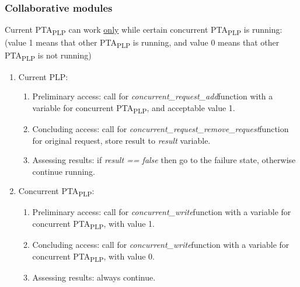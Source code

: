 \subsubsection{Collaborative modules \label{memory_module_applications_collaborative_modules}}
Current PTA\textsubscript{PLP} can work \underline{only} while certain concurrent PTA\textsubscript{PLP} is running: (value 1 means that other PTA\textsubscript{PLP} is running, and value 0 means that other PTA\textsubscript{PLP} is not running)
\begin{enumerate}  
\item Current PLP:
\begin{enumerate}  
\item Preliminary access: call for \textcolor{ColorUppaalFunction}{\textit{concurrent_request_add}}​ function with a variable for concurrent PTA\textsubscript{PLP}, and acceptable value 1. 
\item Concluding access: call for \textcolor{ColorUppaalFunction}{\textit{concurrent_request_remove_request}}​ function for original request, store result to \textcolor{ColorEdgeGuard}{\textit{result}} variable. 
\item Assessing results: if \textcolor{ColorEdgeGuard}{\textit{result == false}} then go to the failure state, otherwise continue running.
\end{enumerate}  
\item Concurrent PTA\textsubscript{PLP}:
\begin{enumerate} 
\item Preliminary access: call for \textcolor{ColorUppaalFunction}{\textit{concurrent_write}}​ function with a variable for concurrent PTA\textsubscript{PLP}, with value 1. 
\item Concluding access: call for \textcolor{ColorUppaalFunction}{\textit{concurrent_write}}​ function with a variable for concurrent PTA\textsubscript{PLP}, with value 0. 
\item Assessing results: always continue.
\end{enumerate}
\end{enumerate}
